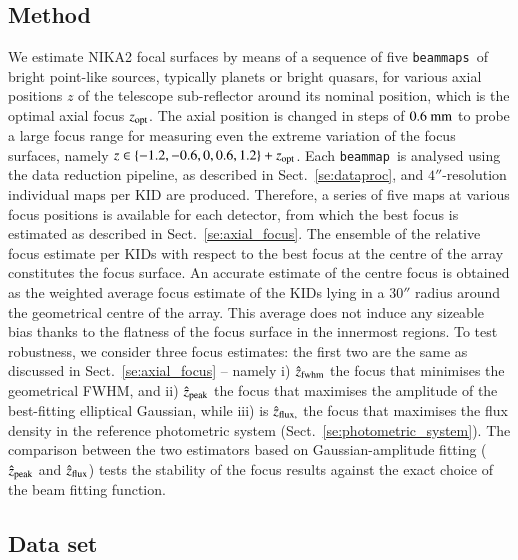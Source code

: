 \documentclass[traditionalabstract]{aa}
\newcommand{\bm}{{\tt beammap}}
\newcommand{\bms}{{\tt beammaps}}
\begin{document}
{\begin{appendix}
\subsection{Method}

We estimate NIKA2 focal surfaces by means of a sequence of five \bms\ of bright
point-like sources, typically planets or bright quasars, for various
axial positions $z$ of the telescope sub-reflector around its nominal
position, which is the optimal axial focus $z_{\rm{opt}}$. 
The axial position is changed in steps of $0.6~\rm{mm}$ to probe a large
focus range for measuring even the extreme variation of the focus surfaces,
namely $z \in \{-1.2, -0.6, 0, 0.6, 1.2 \} + z_{\rm{opt}}$.  Each
\bm\ is analysed using the data reduction pipeline, as described in
Sect.~\ref{se:dataproc}, and $4''$-resolution individual maps per KID
are produced. 
Therefore, a series of
five maps at various focus positions is available for each detector, from which
the best focus is estimated as described in Sect.~\ref{se:axial_focus}. The
ensemble of the relative focus estimate per KIDs with respect to the best focus
at the centre of the array constitutes the focus surface. An accurate estimate
of the centre focus is obtained as the weighted average focus estimate of the
KIDs lying in a $30''$ radius around the geometrical centre of the array. This
average does not induce any sizeable bias thanks to the flatness of the focus
surface in the innermost regions. To test robustness, we consider three focus
estimates: the first two are the same as discussed in
Sect.~\ref{se:axial_focus} -- namely i) $\hat z_{\rm{fwhm}}$ the focus that
minimises the geometrical FWHM, and ii) $\hat z_{\rm{peak}}$ the focus that
maximises the amplitude of the best-fitting elliptical Gaussian, while iii) is $\hat z_{\rm{flux,}}$ the focus that maximises the flux
density in the reference photometric system
(Sect.~\ref{se:photometric_system}). The comparison between the two
estimators based on Gaussian-amplitude fitting ($\hat z_{\rm{peak}}$
and $\hat z_{\rm{flux}}$) tests the stability of the focus
results against the exact choice of the beam fitting function.

\subsection{Data set}


\end{appendix}}
\end{document}
